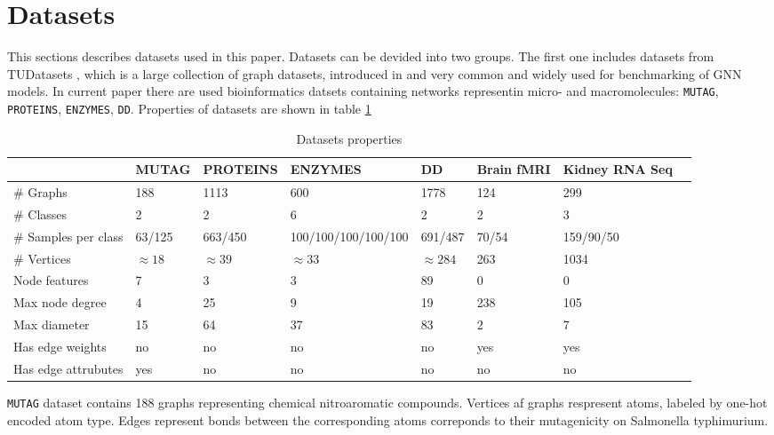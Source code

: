 \section{Datasets}
\label{sec:datasets}
This sections describes datasets used in this paper. Datasets can be devided into two groups.
The first one includes datasets from TUDatasets \cite{TUDataset}, which is
a large collection of graph datasets, introduced in \cite{TUDataset} and very common and widely used for benchmarking of GNN models.
In current paper there are used bioinformatics datsets containing networks representin micro- and macromolecules: \texttt{MUTAG}, \texttt{PROTEINS},
\texttt{ENZYMES}, \texttt{DD}. Properties of datasets are shown in table \ref{tab:datasets}
\begin{center}
    \begin{table}[h]
        \scriptsize
        \begin{tabular}{|l|l|l|l|l|l|l|l|}
            \hline
                                 & MUTAG        & PROTEINS     & ENZYMES             & DD            & Brain fMRI & Kidney RNA Seq \\ \hline
            \# Graphs            & 188          & 1113         & 600                 & 1778          & 124        & 299            \\ \hline
            \# Classes           & 2            & 2            & 6                   & 2             & 2          & 3              \\ \hline
            \# Samples per class & 63/125       & 663/450      & 100/100/100/100/100 & 691/487       & 70/54      & 159/90/50      \\ \hline
            \# Vertices          & $\approx 18$ & $\approx 39$ & $\approx 33$        & $\approx 284$ & 263        & 1034           \\ \hline
            Node features        & 7            & 3            & 3                   & 89            & 0          & 0              \\ \hline
            Max node degree      & 4            & 25           & 9                   & 19            & 238        & 105            \\ \hline
            Max diameter         & 15           & 64           & 37                  & 83            & 2          & 7              \\ \hline
            Has edge weights     & no           & no           & no                  & no            & yes        & yes            \\ \hline
            Has edge attrubutes  & yes          & no           & no                  & no            & no         & no             \\ \hline
        \end{tabular}
    \caption{Datasets properties}
    \label{tab:datasets}
    \end{table}
\end{center}
\texttt{MUTAG} dataset \cite{MUTAG} contains 188 graphs representing chemical nitroaromatic compounds.
Vertices af graphs respresent atoms, labeled by one-hot encoded atom type.
Edges represent bonds between the corresponding atoms correponds to their mutagenicity on Salmonella typhimurium.

